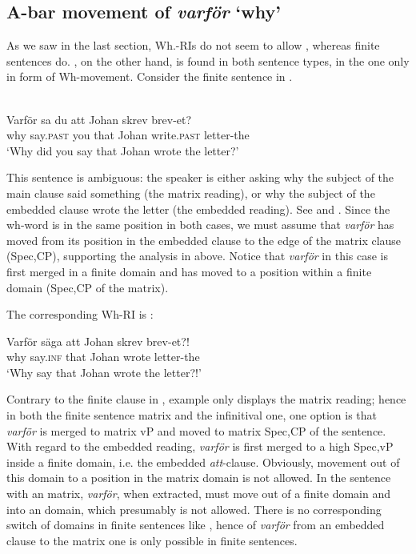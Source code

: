 \documentclass[output=paper]{LSP/langsci}
\begin{document}
\subsection{A-bar movement of \textit{varför}  ‘why’}

As we saw in the last section, Wh.-RIs do not seem to allow , whereas finite sentences do. , on the other hand, is found in both sentence types, in the  one only in form of Wh-movement. Consider the finite sentence in .

\ea%
    \label{ex:platzack:30}
	    \\
\gll Varför  sa        du    att    Johan  skrev      brev-et?\\
 why    say.\textsc{past}  you  that  Johan    write.\textsc{past}  letter-the	\\
\glt ‘Why did you say that Johan wrote the letter?’
\z

This sentence is ambiguous: the speaker is either asking why the subject of the main clause said something (the matrix reading), or why the subject of the embedded clause wrote the letter (the embedded reading). See   \citet{ShlonskySoare2011} and \citet{Simik2006}. Since the wh-word is in the same position in both cases, we must assume that \textit{varför} has moved from its position in the embedded clause to the edge of the matrix clause (Spec,CP), supporting the analysis in  above. Notice that \textit{varför} in this case is first merged in a finite domain and has moved to a position within a finite domain (Spec,CP of the matrix).

The corresponding Wh-RI is :

\ea%
    \label{ex:platzack:31}
\gll Varför  säga    att    Johan  skrev    brev-et?!\\
  why    say.\textsc{inf}  that  Johan    wrote    letter-the	\\
\glt    ‘Why say that Johan wrote the letter?!’
\z 

Contrary to the finite clause in , example  only displays the matrix reading; hence in both the finite sentence matrix and the infinitival one, one option is that \textit{varför} is merged to matrix vP and moved to matrix Spec,CP of the  sentence. With regard to the embedded reading, \textit{varför} is first merged to a high Spec,vP inside a finite domain, i.e. the embedded \textit{att}{}-clause. Obviously, movement out of this domain to a position in the matrix  domain is not allowed. In the sentence with an  matrix, \textit{varför}, when extracted, must move out of a finite domain and into an  domain, which presumably is not allowed. There is no corresponding switch of domains in finite sentences like , hence  of \textit{varför} from an embedded clause to the matrix one is only possible in finite sentences.
\end{document}
